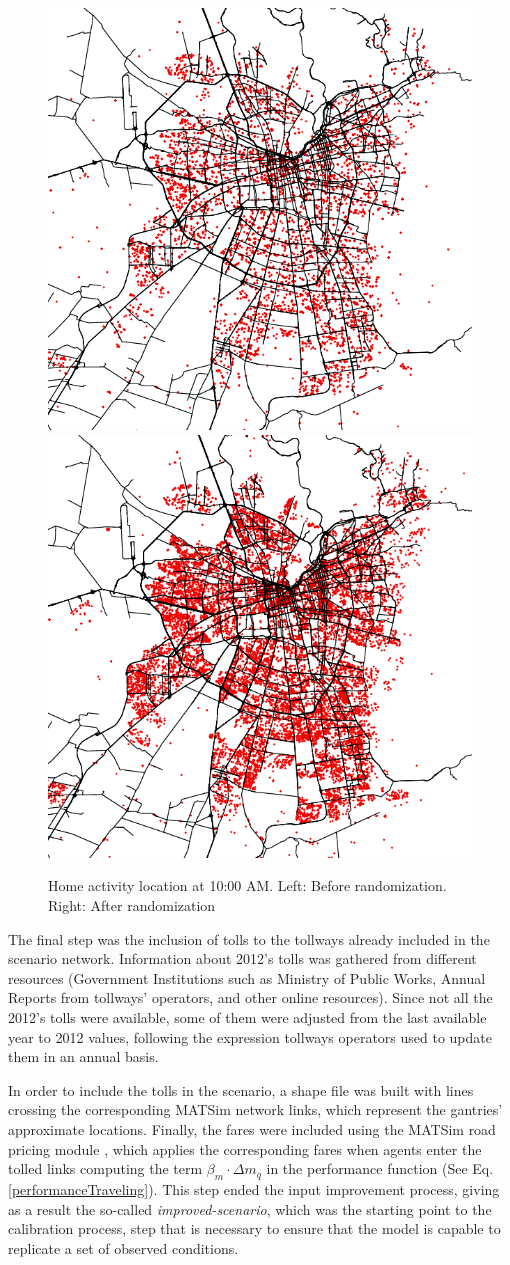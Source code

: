 \documentclass[Journal,letterpaper]{ascelike-new}
\begin{document}
\begin{figure}
	\centering
	\includegraphics[width=.4\linewidth]{images/homeOriginal10AM.png}\hspace{1cm}
	\includegraphics[width=.4\linewidth]{images/homeRandomized10AM.png}
	\caption{Home activity location at 10:00 AM. Left: Before randomization. Right: After randomization}
	\label{homeDistribution}
\end{figure}
The final step was the inclusion of tolls to the tollways already included in the scenario network. Information about 2012's tolls was gathered from different resources (Government Institutions such as Ministry of Public Works, Annual Reports from tollways' operators, and other online resources). Since not all the 2012's tolls were available, some of them were adjusted from the last available year to 2012 values, following the expression tollways operators used to update them in an annual basis.

In order to include the tolls in the scenario, a shape file was built with lines crossing the corresponding MATSim network links, which represent the gantries' approximate locations. Finally, the fares were included using the MATSim road pricing module \citep{RoadPricinginMATSim}, which applies the corresponding fares when agents enter the tolled links computing the term $\beta_{m}\cdot\Delta m_{q}$ in the performance function (See Eq. \ref{performanceTraveling}). This step ended the input improvement process, giving as a result the so-called \textit{improved-scenario}, which was the starting point to the calibration process, step that is necessary to ensure that the model is capable to replicate a set of observed conditions.
\end{document}
